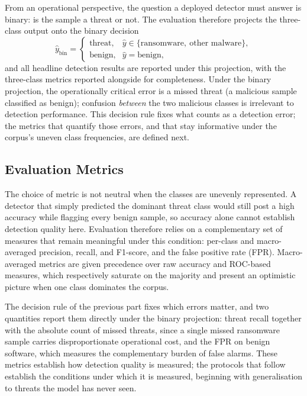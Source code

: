 \documentclass[%
    BCOR=10mm,
    DIV=13,
    toc=bibliography,
    toc=listof,
    oneside,
    12pt,
]{scrbook}
\begin{document}
From an operational perspective, the question a deployed detector must answer
is binary: is the sample a threat or not. The evaluation therefore projects
the three-class output onto the binary decision
\begin{equation}
\hat{y}_{\mathrm{bin}} =
\begin{cases}
\text{threat}, & \hat{y} \in \{\text{ransomware},\ \text{other malware}\},\\[2pt]
\text{benign}, & \hat{y} = \text{benign},
\end{cases}
\label{eq:binary_projection}
\end{equation}
and all headline detection results are reported under this projection, with
the three-class metrics reported alongside for completeness. Under the binary
projection, the operationally critical error is a missed threat (a malicious
sample classified as benign); confusion \emph{between} the two malicious
classes is irrelevant to detection performance. This decision rule fixes what
counts as a detection error; the metrics that quantify those errors, and that
stay informative under the corpus's uneven class frequencies, are defined next.

\subsection{Evaluation Metrics}
\label{subsec:metrics}

The choice of metric is not neutral when the classes are unevenly represented. A
detector that simply predicted the dominant threat class would still post a
high accuracy while flagging every benign sample, so accuracy alone cannot
establish
detection quality here. Evaluation therefore relies on a complementary set of
measures that remain meaningful under this condition: per-class and
macro-averaged precision, recall, and F1-score, and the false positive rate
(FPR). Macro-averaged metrics are given precedence over raw accuracy and
ROC-based measures, which respectively saturate on the majority and present an
optimistic picture when one class dominates the corpus.

The decision rule of the previous part fixes which errors matter, and two
quantities report them directly under the binary projection: threat recall
together with the absolute count of missed threats, since a single missed
ransomware sample carries disproportionate operational cost, and the FPR on
benign software, which measures the complementary burden of false alarms. These
metrics establish how detection quality is measured; the protocols that follow
establish the conditions under which it is measured, beginning with
generalisation to threats the model has never seen.
\end{document}
